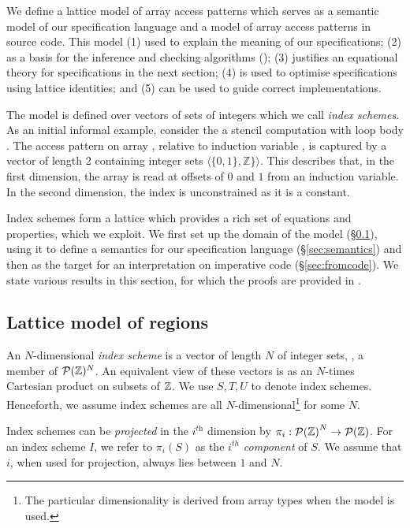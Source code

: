 
\noindent
We define a lattice model of array access patterns which serves as
a semantic model of our specification language and a model of array
access patterns in source code. This model (1) used to explain the
meaning of our specifications; (2) as a basis for the inference and
checking algorithms (); (3) justifies an equational
theory for specifications in the next section; (4) is used to optimise
specifications using lattice identities; and (5) can be used to guide
correct implementations.

The model is defined over vectors of sets of integers which we call
\emph{index schemes}.  As an initial informal example, consider the
a stencil computation with loop body .
The access pattern on array , relative
to induction variable , is captured
by a vector of length 2 containing integer sets $\langle{\{0, 1\},
  \mathbb{Z}\}}\rangle$. This describes that, in the first dimension,
the array is read at offsets of $0$ and $1$ from an induction
variable. In the second dimension, the index is unconstrained
as it is a constant.

Index schemes form a lattice which provides a rich set of equations
and properties, which we exploit. We first set up the 
domain of the model (\S\ref{sec:domain}), using it to define a semantics
for our specification language (\S\ref{sec:semantics}) and then as
the target for an interpretation on imperative code (\S\ref{sec:fromcode}).
We state various results in this section, for which the proofs are
provided in .

\subsection{Lattice model of regions}
\label{sec:domain} 


\begin{defn}
  An $N$-dimensional \emph{index scheme} is a vector of length $N$ of
  integer sets, \ie{}, a member of $\mathcal{P}(\textnormal{$\mathbb{Z}$})^{N}$.
  An equivalent view of these vectors is as an $N$-times Cartesian
  product on subsets of $\textnormal{$\mathbb{Z}$}$.
  We use $S, T, U$ to denote index schemes. Henceforth, we assume index schemes
  are all $N$-dimensional\footnote{The particular
    dimensionality is derived from array types when the model is
    used.} for some $N$.

  Index schemes can be \emph{projected} in the $i^{\textit{th}}$ dimension by
  $\pi_i : {\mathcal{P}(\textnormal{$\mathbb{Z}$}{})}^N \to \mathcal{P}(\textnormal{$\mathbb{Z}$}{})$. For an index scheme
  $I$, we refer to $\pi_i(S)$ as the \emph{$i^{th}$ component} of $S$. We assume
  that $i$, when used for projection, always lies between $1$ and $N$.
\end{defn}



